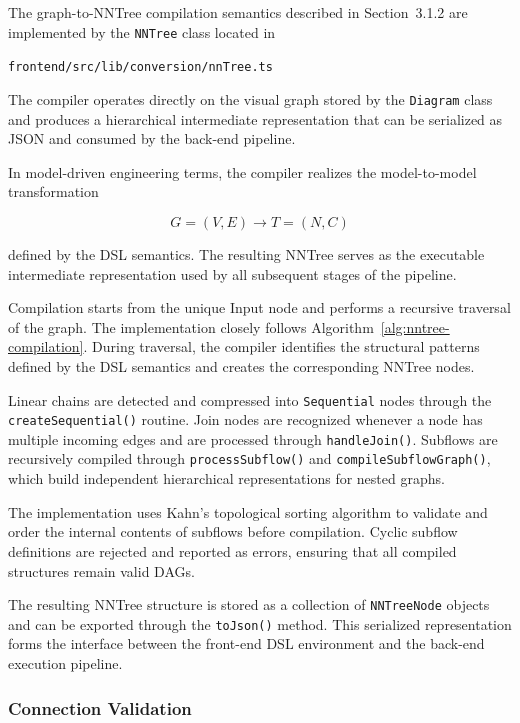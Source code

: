 \documentclass[11pt,a4paper]{article}
\begin{document}
The graph-to-NNTree compilation semantics described in Section~3.1.2 are implemented by the
\texttt{NNTree} class located in

\begin{center}
	\texttt{frontend/src/lib/conversion/nnTree.ts}
\end{center}

The compiler operates directly on the visual graph stored by the \texttt{Diagram} class and
produces a hierarchical intermediate representation that can be serialized as JSON and consumed
by the back-end pipeline.

In model-driven engineering terms, the compiler realizes the model-to-model transformation

\[
	G=(V,E)
	\rightarrow
	T=(N,C)
\]

defined by the DSL semantics. The resulting NNTree serves as the executable intermediate representation used by all subsequent stages of the pipeline.

Compilation starts from the unique Input node and performs a recursive traversal of the graph.
The implementation closely follows Algorithm~\ref{alg:nntree-compilation}. During traversal,
the compiler identifies the structural patterns defined by the DSL semantics and creates the
corresponding NNTree nodes.

Linear chains are detected and compressed into \texttt{Sequential} nodes through the
\texttt{createSequential()} routine. Join nodes are recognized whenever a node has multiple
incoming edges and are processed through \texttt{handleJoin()}. Subflows are recursively compiled
through \texttt{processSubflow()} and \texttt{compileSubflowGraph()}, which build independent
hierarchical representations for nested graphs.

The implementation uses Kahn's topological sorting algorithm to validate and order the internal
contents of subflows before compilation. Cyclic subflow definitions are rejected and reported as
errors, ensuring that all compiled structures remain valid DAGs.

The resulting NNTree structure is stored as a collection of \texttt{NNTreeNode} objects and can
be exported through the \texttt{toJson()} method. This serialized representation forms the
interface between the front-end DSL environment and the back-end execution pipeline.


\subsubsection{Connection Validation}
\end{document}
